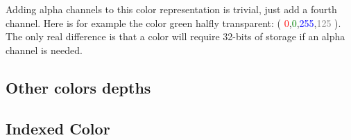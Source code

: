 \newcommand{\rgbaquad}[4]{(
  \textcolor{red}{#1},\textcolor{green}{#2},\textcolor{blue}{#3},\textcolor{grey}{#4} )}

Adding alpha channels to this color representation is trivial, just
add a fourth channel. Here is for example the color green halfly
transparent: \rgbaquad{0}{0}{255}{125}. The only real difference is
that a color will require 32-bits of storage if an alpha channel is needed.

\subsection{Other colors depths}
\label{sec:other-colors-depths}

\subsection{Indexed Color}
\label{sec:indexed-color}


\printbibliography[heading=subbibliography]
